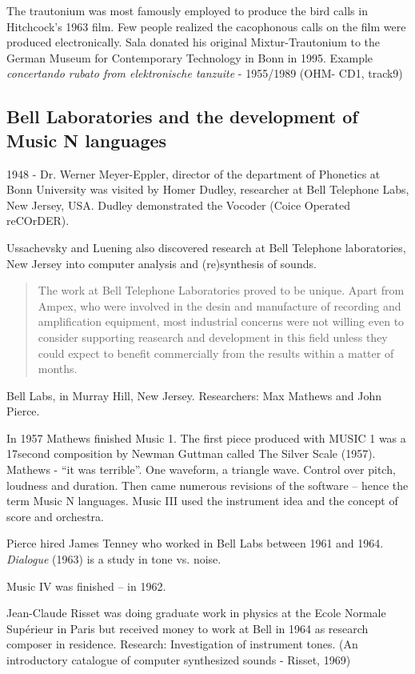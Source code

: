 The trautonium was most famously employed to produce the bird calls in Hitchcock's 1963 film. Few people realized the cacophonous calls on the film were produced electronically. Sala donated his original Mixtur-Trautonium to the German Museum for Contemporary Technology in Bonn in 1995. Example \textit{concertando rubato from elektronische tanzuite} - 1955/1989 (OHM- CD1, track9)


\subsection{Bell Laboratories and the development of Music N languages}

1948 - Dr. Werner Meyer-Eppler, director of the department of Phonetics at Bonn University was visited by Homer Dudley, researcher at Bell Telephone Labs, New Jersey, USA. Dudley demonstrated the Vocoder (Coice Operated reCOrDER).

Ussachevsky and Luening also discovered research at Bell Telephone laboratories, New Jersey into computer analysis and (re)synthesis of sounds.

\begin{quotation}
The work at Bell Telephone Laboratories proved to be unique. Apart from Ampex, who were involved in the desin and manufacture of recording and amplification equipment, most industrial concerns were not willing even to consider supporting reasearch and development in this field unless they could expect to benefit commercially from the results within a matter of months. \citep[94]{manning2013electronic}
\end{quotation}


Bell Labs, in Murray Hill, New Jersey. Researchers: Max Mathews and John Pierce.

In 1957 Mathews finished Music 1. The first piece produced with MUSIC 1 was a 17second composition by Newman Guttman called The Silver Scale (1957). Mathews - ``it was terrible''. One waveform, a triangle wave. Control over pitch, loudness and duration. Then came numerous revisions of the software – hence the term Music N languages. Music III used the instrument idea and the concept of score and orchestra.

Pierce hired James Tenney who worked in Bell Labs between 1961 and 1964. \textit{Dialogue} (1963) is a study in tone vs. noise.

Music IV was finished – in 1962.

Jean-Claude Risset was doing graduate work in physics at the Ecole Normale Sup\'erieur in Paris but received money to work at Bell in 1964 as research composer in residence. Research: Investigation of instrument tones. (An introductory catalogue of computer synthesized sounds - Risset, 1969)

